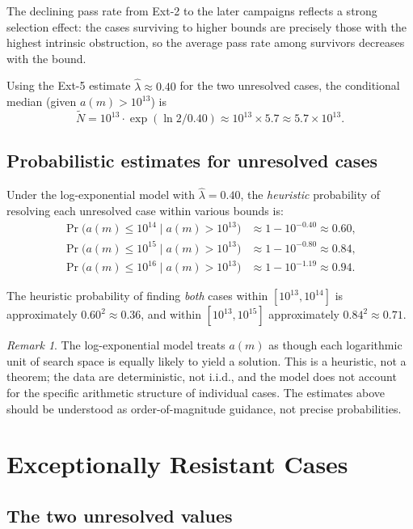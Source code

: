 \documentclass[11pt]{article}
\theoremstyle{definition}
\theoremstyle{remark}
\newtheorem{remark}{Remark}
\numberwithin{equation}{section}
\begin{document}
The declining pass rate from Ext-2 to the later campaigns
reflects a strong selection effect: the cases surviving to higher
bounds are precisely those with the highest intrinsic obstruction,
so the average pass rate among survivors decreases with the bound.

Using the Ext-5 estimate $\hat\lambda \approx 0.40$ for the
two unresolved cases, the conditional median (given $a(m) > 10^{13}$)
is
\[
\tilde{N} = 10^{13} \cdot \exp(\ln 2 / 0.40)
\approx 10^{13} \times 5.7
\approx 5.7 \times 10^{13}.
\]

\subsection{Probabilistic estimates for unresolved cases}

Under the log-exponential model with $\hat\lambda = 0.40$,
the \emph{heuristic} probability of resolving each unresolved case
within various bounds is:
\begin{align*}
\Pr\bigl(a(m) \le 10^{14} \mid a(m) > 10^{13}\bigr)
  &\approx 1 - 10^{-0.40} \approx 0.60, \\
\Pr\bigl(a(m) \le 10^{15} \mid a(m) > 10^{13}\bigr)
  &\approx 1 - 10^{-0.80} \approx 0.84, \\
\Pr\bigl(a(m) \le 10^{16} \mid a(m) > 10^{13}\bigr)
  &\approx 1 - 10^{-1.19} \approx 0.94.
\end{align*}

The heuristic probability of finding \emph{both} cases within
$[10^{13}, 10^{14}]$ is approximately $0.60^2 \approx 0.36$,
and within $[10^{13}, 10^{15}]$ approximately
$0.84^2 \approx 0.71$.

\begin{remark}
The log-exponential model treats $a(m)$ as though each logarithmic
unit of search space is equally likely to yield a solution.  This is
a heuristic, not a theorem; the data are deterministic, not i.i.d.,
and the model does not account for the specific arithmetic structure
of individual cases.  The estimates above should be understood as
order-of-magnitude guidance, not precise probabilities.
\end{remark}

\section{Exceptionally Resistant Cases}
\label{sec:exceptional}

\subsection{The two unresolved values}
\end{document}
